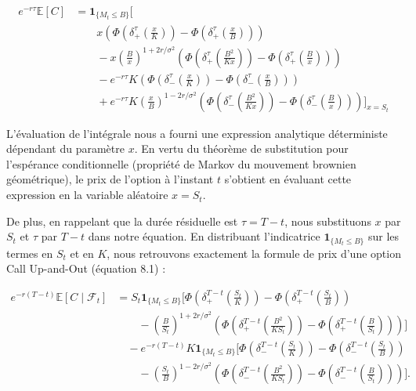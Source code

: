 \documentclass[11pt]{article}
\begin{document}
\begin{align}
e^{-r\tau} \mathbb{E}[C] &= \mathbf{1}_{\{M_t \le B\}} \Bigg[ \nonumber \\
&\qquad x \left( \Phi\left(\delta_{+}^{\tau}\left(\frac{x}{K}\right)\right) - \Phi\left(\delta_{+}^{\tau}\left(\frac{x}{B}\right)\right) \right) \nonumber \\
&\qquad - x \left( \frac{B}{x} \right)^{1 + 2r/\sigma^2} \left( \Phi\left(\delta_{+}^{\tau}\left(\frac{B^2}{Kx}\right)\right) - \Phi\left(\delta_{+}^{\tau}\left(\frac{B}{x}\right)\right) \right) \nonumber \\
&\qquad - e^{-r\tau} K \left( \Phi\left(\delta_{-}^{\tau}\left(\frac{x}{K}\right)\right) - \Phi\left(\delta_{-}^{\tau}\left(\frac{x}{B}\right)\right) \right) \nonumber \\
&\qquad + e^{-r\tau} K \left( \frac{x}{B} \right)^{1 - 2r/\sigma^2} \left( \Phi\left(\delta_{-}^{\tau}\left(\frac{B^2}{Kx}\right)\right) - \Phi\left(\delta_{-}^{\tau}\left(\frac{B}{x}\right)\right) \right) \Bigg]_{x=S_t}
\end{align}

L'évaluation de l'intégrale nous a fourni une expression analytique déterministe dépendant du paramètre $x$. En vertu du théorème de substitution pour l'espérance conditionnelle (propriété de Markov du mouvement brownien géométrique), le prix de l'option à l'instant $t$ s'obtient en évaluant cette expression en la variable aléatoire $x = S_t$.

De plus, en rappelant que la durée résiduelle est $\tau = T - t$, nous substituons $x$ par $S_t$ et $\tau$ par $T - t$ dans notre équation. En distribuant l'indicatrice $\mathbf{1}_{\{M_t \le B\}}$ sur les termes en $S_t$ et en $K$, nous retrouvons exactement la formule de prix d'une option Call Up-and-Out (équation 8.1) :

\begin{align}
e^{-r(T-t)} \mathbb{E} \left[ C \mid \mathcal{F}_t \right] &= S_t \mathbf{1}_{\{M_t \le B\}} \Bigg[ \Phi\left(\delta_{+}^{T-t}\left(\frac{S_t}{K}\right)\right) - \Phi\left(\delta_{+}^{T-t}\left(\frac{S_t}{B}\right)\right) \nonumber \\
&\qquad - \left( \frac{B}{S_t} \right)^{1 + 2r/\sigma^2} \left( \Phi\left(\delta_{+}^{T-t}\left(\frac{B^2}{K S_t}\right)\right) - \Phi\left(\delta_{+}^{T-t}\left(\frac{B}{S_t}\right)\right) \right) \Bigg] \nonumber \\
&\quad - e^{-r(T-t)} K \mathbf{1}_{\{M_t \le B\}} \Bigg[ \Phi\left(\delta_{-}^{T-t}\left(\frac{S_t}{K}\right)\right) - \Phi\left(\delta_{-}^{T-t}\left(\frac{S_t}{B}\right)\right) \nonumber \\
&\qquad - \left( \frac{S_t}{B} \right)^{1 - 2r/\sigma^2} \left( \Phi\left(\delta_{-}^{T-t}\left(\frac{B^2}{K S_t}\right)\right) - \Phi\left(\delta_{-}^{T-t}\left(\frac{B}{S_t}\right)\right) \right) \Bigg].
\end{align}
\end{document}
